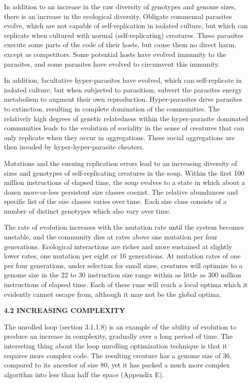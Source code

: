 In addition to an increase in the raw diversity of genotypes and genome sizes,
there is an increase in the ecological diversity.  Obligate commensal
parasites evolve, which are not capable of self-replication in isolated
culture, but which can replicate when cultured with normal (self-replicating)
creatures.  These parasites execute some parts of the code of their hosts,
but cause them no direct harm, except as competitors.  Some potential hosts
have evolved immunity to the parasites, and some parasites have evolved to
circumvent this immunity.

In addition, facultative hyper-parasites have evolved, which can
self-replicate in isolated culture, but when subjected to parasitism, subvert
the parasites energy metabolism to augment their own reproduction.
Hyper-parasites drive parasites to extinction, resulting in complete
domination of the communities.  The relatively high degrees of genetic
relatedness within the hyper-parasite dominated communities leads to the
evolution of sociality in the sense of creatures that can only replicate
when they occur in aggregations.  These social aggregations are then invaded
by hyper-hyper-parasite cheaters.

Mutations and the ensuing replication errors lead to an increasing diversity
of sizes and genotypes of self-replicating creatures in the soup.  Within
the first 100 million instructions of elapsed time, the soup evolves to
a state in which about a dozen more-or-less persistent size classes coexist.
The relative abundances and specific list of the size classes varies over time.
Each size class consists of a number of distinct genotypes which also vary
over time.

The rate of evolution increases with the mutation rate until the system
becomes unstable, and the community dies at rates above one mutation per four
generations.  Ecological interactions are richer and more sustained at
slightly lower rates, one mutation per eight or 16 generations.  At mutation
rates of one per four generations, under selection for small sizes, creatures
will optimize to a genome size in the 22 to 30 instruction size range within
as little as 300 million instructions of elapsed time.  Each of these runs
will reach a local optima which it evidently cannot escape from, although it
may not be the global optima.

\LP
\bf 4.2 INCREASING COMPLEXITY\rm
\eLP

The unrolled loop (section 3.1.1.8) is an example of the ability of evolution
to produce an increase in complexity, gradually over a long period of time.
The interesting thing about the loop unrolling optimization technique is that
it requires more complex code.  The resulting creature has a genome size of 36,
compared to its ancestor of size 80, yet it has packed a much more complex
algorithm into less than half the space (Appendix E).

